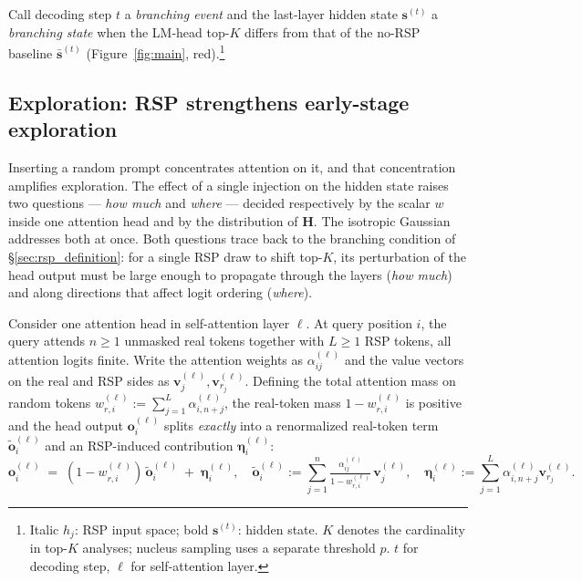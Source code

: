 Call decoding step $t$ a \emph{branching event} and the last-layer hidden state $\mathbf{s}^{(t)}$ a \emph{branching state} when the LM-head top-$K$ differs from that of the no-RSP baseline $\bar{\mathbf{s}}^{(t)}$ (Figure~\ref{fig:main}, red).\footnote{Italic $h_j$: RSP input space; bold $\mathbf{s}^{(t)}$: hidden state. $K$ denotes the cardinality in top-$K$ analyses; nucleus sampling uses a separate threshold $p$. $t$ for decoding step, $\ell$ for self-attention layer.}

\subsection{Exploration: RSP strengthens early-stage exploration}\label{sec:improve}\label{sec:multipath}

Inserting a random prompt concentrates attention on it, and that concentration amplifies exploration. The effect of a single injection on the hidden state raises two questions --- \emph{how much} and \emph{where} --- decided respectively by the scalar $w$ inside one attention head and by the distribution of $\mathbf{H}$. The isotropic Gaussian addresses both at once. Both questions trace back to the branching condition of \S\ref{sec:rsp_definition}: for a single RSP draw to shift top-$K$, its perturbation of the head output must be large enough to propagate through the layers (\emph{how much}) and along directions that affect logit ordering (\emph{where}).

Consider one attention head in self-attention layer $\ell$. At query position $i$, the query attends $n\ge1$ unmasked real tokens together with $L\ge1$ RSP tokens, all attention logits finite. Write the attention weights as $\alpha_{ij}^{(\ell)}$ and the value vectors on the real and RSP sides as $\mathbf{v}_j^{(\ell)},\mathbf{v}_{r_j}^{(\ell)}$. Defining the total attention mass on random tokens $w_{r,i}^{(\ell)} := \sum_{j=1}^L \alpha_{i,n+j}^{(\ell)}$, the real-token mass $1-w_{r,i}^{(\ell)}$ is positive and the head output $\mathbf{o}_i^{(\ell)}$ splits \emph{exactly} into a renormalized real-token term $\tilde{\mathbf{o}}_i^{(\ell)}$ and an RSP-induced contribution $\boldsymbol{\eta}_i^{(\ell)}$:
\begin{equation}\label{eq:decomp}
\mathbf{o}_i^{(\ell)}
\;=\;
(1-w_{r,i}^{(\ell)})\,\tilde{\mathbf{o}}_i^{(\ell)}
\;+\;
\boldsymbol{\eta}_i^{(\ell)},
\quad
\tilde{\mathbf{o}}_i^{(\ell)} := \sum_{j=1}^n \tfrac{\alpha_{ij}^{(\ell)}}{1-w_{r,i}^{(\ell)}}\,\mathbf{v}_j^{(\ell)},
\quad
\boldsymbol{\eta}_i^{(\ell)} := \sum_{j=1}^L \alpha_{i,n+j}^{(\ell)}\mathbf{v}_{r_j}^{(\ell)}.
\end{equation}

